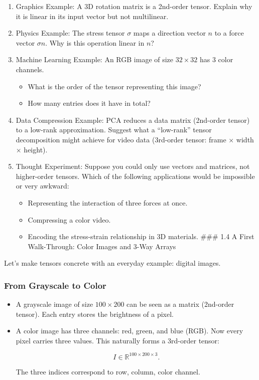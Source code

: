\documentclass[
  letterpaper,
  DIV=11,
  numbers=noendperiod]{scrreprt}
\providecommand{\tightlist}{%
  \setlength{\itemsep}{0pt}\setlength{\parskip}{0pt}}
\begin{document}
\begin{enumerate}
\def\labelenumi{\arabic{enumi}.}
\item
  Graphics Example: A 3D rotation matrix is a 2nd-order tensor. Explain
  why it is linear in its input vector but not multilinear.
\item
  Physics Example: The stress tensor \(\sigma\) maps a direction vector
  \(n\) to a force vector \(\sigma n\). Why is this operation linear in
  \(n\)?
\item
  Machine Learning Example: An RGB image of size \(32 \times 32\) has 3
  color channels.

  \begin{itemize}
  \tightlist
  \item
    What is the order of the tensor representing this image?
  \item
    How many entries does it have in total?
  \end{itemize}
\item
  Data Compression Example: PCA reduces a data matrix (2nd-order tensor)
  to a low-rank approximation. Suggest what a ``low-rank'' tensor
  decomposition might achieve for video data (3rd-order tensor: frame ×
  width × height).
\item
  Thought Experiment: Suppose you could only use vectors and matrices,
  not higher-order tensors. Which of the following applications would be
  impossible or very awkward:

  \begin{itemize}
  \tightlist
  \item
    Representing the interaction of three forces at once.
  \item
    Compressing a color video.
  \item
    Encoding the stress-strain relationship in 3D materials. \#\#\# 1.4
    A First Walk-Through: Color Images and 3-Way Arrays
  \end{itemize}
\end{enumerate}

Let's make tensors concrete with an everyday example: digital images.

\subsubsection{From Grayscale to Color}\label{from-grayscale-to-color}

\begin{itemize}
\item
  A grayscale image of size \(100 \times 200\) can be seen as a matrix
  (2nd-order tensor). Each entry stores the brightness of a pixel.
\item
  A color image has three channels: red, green, and blue (RGB). Now
  every pixel carries three values. This naturally forms a 3rd-order
  tensor:

  \[
  I \in \mathbb{R}^{100 \times 200 \times 3}.
  \]

  The three indices correspond to row, column, color channel.
\end{itemize}
\end{document}
